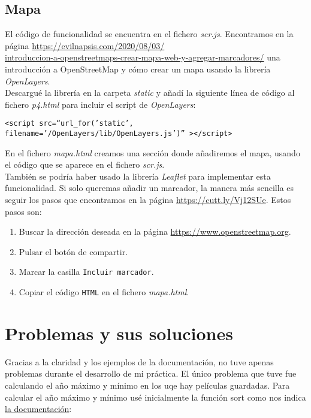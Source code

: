 \documentclass{article}
\begin{document}
\subsection{Mapa}

El código de funcionalidad se encuentra en el fichero \textit{scr.js}. Encontramos en la página \href{https://evilnapsis.com/2020/08/03/introduccion-a-openstreetmaps-crear-mapa-web-y-agregar-marcadores/}{https://evilnapsis.com/2020/08/03/\\introduccion-a-openstreetmaps-crear-mapa-web-y-agregar-marcadores/} una introducción a OpenStreetMap y cómo crear un mapa usando la librería \textit{OpenLayers}.\\

Descargué la librería en la carpeta \textit{static} y añadí la siguiente línea de código al fichero \textit{p4.html} para incluir el script de \textit{OpenLayers}:
\vspace{-1mm}
\begin{center}
  \texttt{<script src=``{{url\_for('static', filename='/OpenLayers/lib/OpenLayers.js')}}'' ></script>}
\end{center}

En el fichero \textit{mapa.html} creamos una sección donde añadiremos el mapa, usando el código que se aparece en el fichero \textit{scr.js}.\\

También se podría haber usado la librería \textit{Leaflet} para implementar esta funcionalidad. Si solo queremas añadir un marcador, la manera más sencilla es seguir los pasos que encontramos en la página \href{https://cutt.ly/Vj12SUe}{https://cutt.ly/Vj12SUe}. Estos pasos son:

\begin{enumerate}
\item Buscar la dirección deseada en la página \href{https://www.openstreetmap.org}{https://www.openstreetmap.org}.
\item Pulsar el botón de compartir.
\item Marcar la casilla \texttt{Incluir marcador}.
\item Copiar el código \texttt{HTML} en el fichero \textit{mapa.html}.
\end{enumerate}

\section{Problemas y sus soluciones}

Gracias a la claridad y los ejemplos de la documentación, no tuve apenas problemas durante el desarrollo de mi práctica. El único problema que tuve fue calculando el año máximo y mínimo en los uqe hay películas guardadas.
Para calcular el año máximo y mínimo usé inicialmente la función sort como nos indica \href{https://docs.mongodb.com/manual/reference/method/cursor.sort/}{la documentación}:
\end{document}
